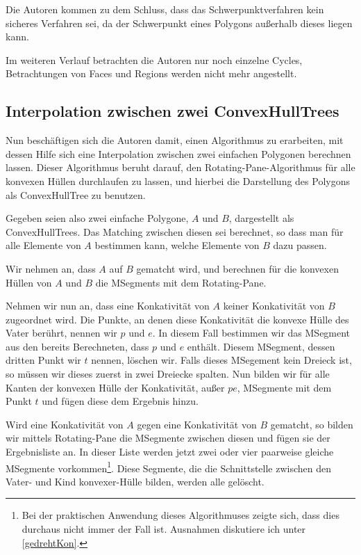 Die Autoren kommen zu dem Schluss, dass das Schwerpunktverfahren kein sicheres Verfahren sei, da der Schwerpunkt eines Polygons außerhalb dieses liegen kann.

Im weiteren Verlauf betrachten die Autoren nur noch einzelne Cycles, Betrachtungen von Faces und Regions werden nicht mehr angestellt.

\subsection{Interpolation zwischen zwei ConvexHullTrees}

Nun beschäftigen sich die Autoren damit, einen Algorithmus zu erarbeiten, mit dessen Hilfe sich eine Interpolation zwischen zwei einfachen Polygonen berechnen lassen. Dieser Algorithmus beruht darauf, den Rotating-Pane-Algorithmus für alle konvexen Hüllen durchlaufen zu lassen, und hierbei die Darstellung des Polygons als ConvexHullTree zu benutzen.

Gegeben seien also zwei einfache Polygone, $A$ und $B$, dargestellt als ConvexHullTrees. Das Matching zwischen diesen sei berechnet, so dass man für alle Elemente von $A$ bestimmen kann, welche Elemente von $B$ dazu passen.

Wir nehmen an, dass $A$ auf $B$ gematcht wird, und berechnen für die konvexen Hüllen von $A$ und $B$ die MSegments mit dem  Rotating-Pane. 

Nehmen wir nun an, dass eine Konkativität von $A$ keiner Konkativität von $B$ zugeordnet wird. Die Punkte, an denen diese Konkativität die konvexe Hülle des Vater berührt, nennen wir $p$ und $e$. In diesem Fall bestimmen wir das MSegment aus den bereits Berechneten, dass $p$ und $e$ enthält. Diesem MSegment, dessen dritten Punkt wir $t$ nennen, löschen wir. Falls dieses MSegement kein Dreieck ist, so müssen wir dieses zuerst in zwei Dreiecke spalten. Nun bilden wir für alle Kanten der konvexen Hülle der Konkativität, außer $pe$, MSegmente mit dem Punkt $t$ und fügen diese dem Ergebnis hinzu.

Wird eine Konkativität von $A$ gegen eine Konkativität von $B$ gematcht, so bilden wir mittels Rotating-Pane die MSegmente zwischen diesen und fügen sie der Ergebnisliste an. In dieser Liste werden jetzt zwei oder vier paarweise gleiche MSegmente vorkommen\footnote{Bei der praktischen Anwendung dieses Algorithmuses zeigte sich, dass dies durchaus nicht immer der Fall ist. Ausnahmen diskutiere ich unter \ref{gedrehtKon}.}. Diese Segmente, die die Schnittstelle zwischen den Vater- und Kind konvexer-Hülle bilden, werden alle gelöscht. 

